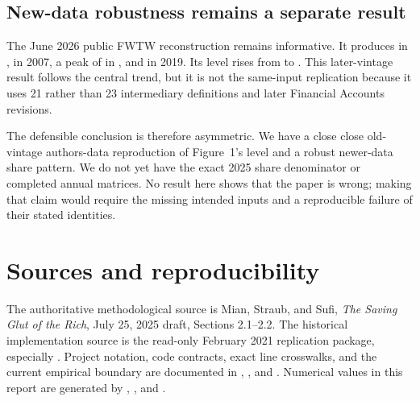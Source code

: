 \documentclass[11pt]{article}
\begin{document}
\subsection{New-data robustness remains a separate result}

The June 2026 public FWTW reconstruction remains informative.  It produces
\FigureOneStartShare{} in \FigureOneStartYear{}, \FigureOneSevenShare{} in
2007, a peak of \FigureOnePeakShare{} in \FigureOnePeakYear{}, and
\FigureOneEndShare{} in 2019.  Its level rises from \FigureOneStartLevel{} to
\FigureOneEndLevel{}.  This later-vintage result follows the central trend,
but it is not the same-input replication because it uses 21 rather than 23
intermediary definitions and later Financial Accounts revisions.

The defensible conclusion is therefore asymmetric.  We have a close
close old-vintage authors-data reproduction of Figure~1's level and a robust newer-data share
pattern.  We do not yet have the exact 2025 share denominator or completed
annual matrices.  No result here shows that the paper is wrong; making that
claim would require the missing intended inputs and a reproducible failure of
their stated identities.

\enlargethispage{2\baselineskip}
\section*{Sources and reproducibility}

The authoritative methodological source is Mian, Straub, and Sufi,
\emph{The Saving Glut of the Rich}, July
25, 2025 draft, Sections 2.1--2.2. The historical implementation source is the
read-only February 2021 replication package, especially
. Project
notation, code contracts, exact line crosswalks, and the current empirical
boundary are documented in ,
, and
. Numerical values in this report are
generated by ,
, and
.
\end{document}
